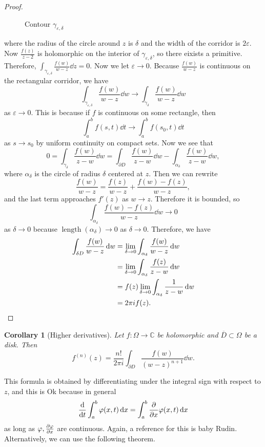 \documentclass[leqno, openany]{memoir}
\newtheorem{cor}[thm]{Corollary}
\theoremstyle{definition}
\theoremstyle{remark}
\theoremstyle{plain}
\theoremstyle{definition}
\theoremstyle{remark}
\newcommand{\C}{\mathbb{C}}
\newcommand{\ep}{\varepsilon}
\newcommand{\ol}[1]{\overline{#1}}
\DeclareMathOperator{\len}{length}
\begin{document}
\begin{proof}
\begin{figure}[H]
\begin{center}
 \end{center}
    \caption{Contour $\gamma_{\ep, \delta}$}%
\end{figure} where
    the radius of the circle around $z$ is $\delta$ and the width of the
    corridor is $2\ep$. Now $\frac{f(z)}{z-2}$ is holomorphic on the interior
    of $\gamma_{\ep, \delta}$, so there eixists a primitive. Therefore,
    $\int_{\gamma_{\ep, \delta}} \frac{f(w)}{w-z} \dd{z} = 0$. Now we let $\ep
    \to 0$. Because $\frac{f(w)}{w-z}$ is continuous on the rectangular
    corridor, we have \[ \int_{\gamma_{\ep, \delta}} \frac{f(w)}{w-z} \dd{w}
        \to \int_{\gamma_{\delta}} \frac{f(w)}{w-z} \dd{w} \] as $\ep \to 0$.
        This is because if $f$ is continuous on some rectangle, then \[
        \int_a^b f(s,t) \dd{t} \to \int_a^b f(s_0, t) \dd{t} \] as $s \to s_0$
        by uniform continuity on compact sets. Now we see that \[ 0 =
        \int_{\gamma_{\delta}} \frac{f(w)}{z-w} \dd{w} = \int_{\partial D}
    \frac{f(w)}{z-w} \dd{w} - \int_{\alpha_{\delta}} \frac{f(w)}{z-w} \dd{w},
\] where $\alpha_{\delta}$ is the circle of radius $\delta$ centered at $z$.
Then we can rewrite \[ \frac{f(w)}{w-z} = \frac{f(z)}{w-z} + \frac{f(w) -
f(z)}{w-z}, \] and the last term approaches $f'(z)$ as $w \to z$. Therefore it
is bounded, so \[ \int_{\alpha_{\delta}} \frac{f(w) - f(z)}{w-z} \dd{w} \to 0
    \] as $\delta \to 0$ because $\len(\alpha_{\delta}) \to 0$ as $\delta \to
    0$. Therefore, we have \begin{align*} \int_{\delta D} \frac{f(w)}{w-z}
        \dd{w} &= \lim_{\delta \to 0} \int_{\alpha_{\delta}} \frac{f(w)}{w-z}
        \dd{w} \\ &= \lim_{\delta \to 0} \int_{\alpha_{\delta}}
    \frac{f(z)}{z-w} \dd{w} \\ &= f(z) \lim_{\delta \to 0}
\int_{\alpha_{\delta}} \frac{1}{z-w} \dd{w} \\ &= 2 \pi i f(z). \qedhere
\end{align*} \end{proof}

\begin{cor}[Higher derivatives] Let $f \colon \Omega \to \C$ be holomorphic and
    $\ol{D} \subset \Omega$ be a disk. Then \[ f^{(n)}(z) = \frac{n!}{2 \pi i}
    \int_{\partial D} \frac{f(w)}{{(w-z)}^{n+1}} \dd{w}. \] \end{cor} This
    formula is obtained by differentiating under the integral sign with respect
    to $z$, and this is Ok because in general \[ \dv{t} \int_a^b \varphi(x,t)
    \dd{x} = \int_a^b \pdv{x} \varphi(x, t) \dd{x} \] as long as $\varphi,
    \pdv{\varphi}{x}$ are continuous. Again, a reference for this is baby
    Rudin. Alternatively, we can use the following theorem.
\end{document}
